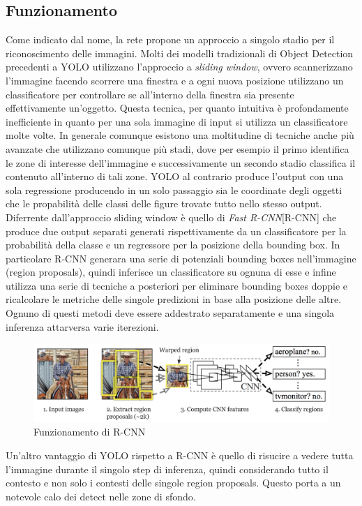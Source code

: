 \documentclass[12pt,a4paper,openright,twoside]{report}
\begin{document}
\subsection{Funzionamento}
Come indicato dal nome, la rete propone un approccio a singolo stadio per il riconoscimento delle immagini. Molti dei modelli tradizionali di Object Detection precedenti a YOLO utilizzano l'approccio a \emph{sliding window}, ovvero scannerizzano l'immagine facendo scorrere una finestra e a ogni nuova posizione utilizzano un classificatore per controllare se all'interno della finestra sia presente effettivamente un'oggetto. 
Questa tecnica, per quanto intuitiva è profondamente inefficiente in quanto per una sola immagine di input si utilizza un classificatore molte volte.
In generale comunque esistono una moltitudine di tecniche anche più avanzate che utilizzano comunque più stadi, dove per esempio il primo identifica le zone di interesse dell'immagine e successivamente un secondo stadio classifica il contenuto all'interno di tali zone. 
YOLO al contrario produce l'output con una sola regressione producendo in un solo passaggio sia le coordinate degli oggetti che le propabilità delle classi delle figure trovate tutto nello stesso output.
Diferrente dall'approccio sliding window è quello di \emph{Fast R-CNN}[R-CNN] che produce due output separati generati rispettivamente da un classificatore per la probabilità della classe e un regressore per la posizione della bounding box. In particolare R-CNN generara una serie di potenziali bounding boxes nell'immagine (region proposals), quindi inferisce un classificatore su ognuna di esse e infine utilizza una serie di tecniche a posteriori per eliminare bounding boxes doppie e ricalcolare le metriche delle singole predizioni in base alla posizione delle altre. Ognuno di questi metodi deve essere addestrato separatamente e una singola inferenza attarversa varie iterezioni.
\begin{figure}[h]
\centering
\includegraphics[width=\linewidth]{RCNN.png}
\caption{Funzionamento di R-CNN}
\end{figure}
Un'altro vantaggio di YOLO rispetto a R-CNN è quello di risucire a vedere tutta l'immagine durante il singolo step di inferenza, quindi considerando tutto il contesto e non solo i contesti delle singole region proposals. Questo porta a un notevole calo dei detect nelle zone di sfondo.
\end{document}
